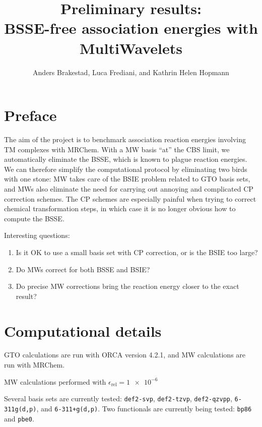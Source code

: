 \documentclass[11pt,a4paper]{article}
\author{Anders Brakestad, Luca Frediani, and Kathrin Helen Hopmann}
\title{Preliminary results: \\ BSSE-free association energies with MultiWavelets}
\begin{document}
	\maketitle
	\tableofcontents

\setcounter{secnumdepth}{1}

\section{Preface}
The aim of the project is to benchmark association reaction energies involving TM complexes with MRChem.
With a MW basis ``at'' the CBS limit, we automatically eliminate the BSSE, which is known to plague reaction energies.
We can therefore simplify the computational protocol by eliminating two birds with one stone: MW takes care of the BSIE problem related to GTO basis sets, and MWs also eliminate the need for carrying out annoying and complicated CP correction schemes.
The CP schemes are especially painful when trying to correct chemical transformation steps, in which case it is no longer obvious how to compute the BSSE.

Interesting questions:

\begin{enumerate}
	\item Is it OK to use a small basis set with CP correction, or is the BSIE too large?
	\item Do MWs correct for both BSSE and BSIE? 
	\item Do precise MW corrections bring the reaction energy closer to the exact result?
\end{enumerate}

\section*{Computational details}
GTO calculations are run with ORCA version 4.2.1, and MW calculations are run with MRChem.

MW calculations performed with $\epsilon_{\text{rel}} = \num{1e-6}$

Several basis sets are currently tested: \verb|def2-svp|, \verb|def2-tzvp|, \verb|def2-qzvpp|, \verb|6-311g(d,p)|, and \verb|6-311+g(d,p)|.
Two functionals are currently being tested: \verb|bp86| and \verb|pbe0|.
\end{document}
